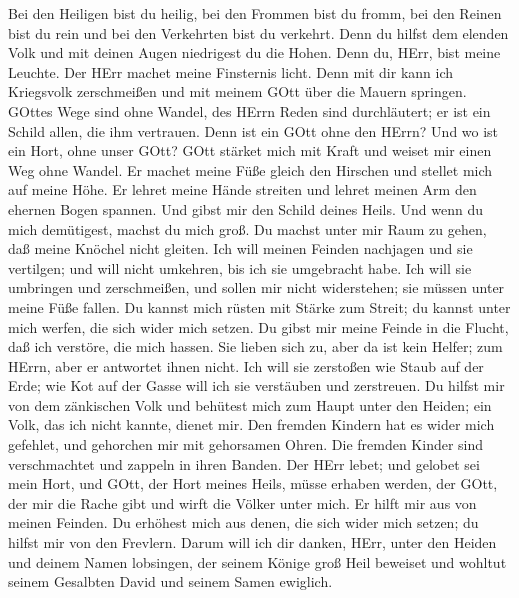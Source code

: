 Bei den Heiligen bist du heilig, bei den Frommen bist du fromm,
 bei den Reinen bist du rein und bei den Verkehrten bist du
verkehrt.  Denn du hilfst dem elenden Volk und mit deinen
Augen niedrigest du die Hohen.  Denn du, HErr, bist meine
Leuchte. Der HErr machet meine Finsternis licht.  Denn mit
dir kann ich Kriegsvolk zerschmeißen und mit meinem GOtt über die Mauern
springen.  GOttes Wege sind ohne Wandel, des HErrn Reden
sind durchläutert; er ist ein Schild allen, die ihm vertrauen.
 Denn ist ein GOtt ohne den HErrn? Und wo ist ein Hort,
ohne unser GOtt?  GOtt stärket mich mit Kraft und weiset
mir einen Weg ohne Wandel.  Er machet meine Füße gleich den
Hirschen und stellet mich auf meine Höhe.  Er lehret meine
Hände streiten und lehret meinen Arm den ehernen Bogen spannen.
 Und gibst mir den Schild deines Heils. Und wenn du mich
demütigest, machst du mich groß.  Du machst unter mir Raum
zu gehen, daß meine Knöchel nicht gleiten.  Ich will meinen
Feinden nachjagen und sie vertilgen; und will nicht umkehren, bis ich
sie umgebracht habe.  Ich will sie umbringen und
zerschmeißen, und sollen mir nicht widerstehen; sie müssen unter meine
Füße fallen.  Du kannst mich rüsten mit Stärke zum Streit;
du kannst unter mich werfen, die sich wider mich setzen. 
Du gibst mir meine Feinde in die Flucht, daß ich verstöre, die mich
hassen.  Sie lieben sich zu, aber da ist kein Helfer; zum
HErrn, aber er antwortet ihnen nicht.  Ich will sie
zerstoßen wie Staub auf der Erde; wie Kot auf der Gasse will ich sie
verstäuben und zerstreuen.  Du hilfst mir von dem
zänkischen Volk und behütest mich zum Haupt unter den Heiden; ein Volk,
das ich nicht kannte, dienet mir.  Den fremden Kindern hat
es wider mich gefehlet, und gehorchen mir mit gehorsamen Ohren.
 Die fremden Kinder sind verschmachtet und zappeln in ihren
Banden.  Der HErr lebet; und gelobet sei mein Hort, und
GOtt, der Hort meines Heils, müsse erhaben werden,  der
GOtt, der mir die Rache gibt und wirft die Völker unter mich.
 Er hilft mir aus von meinen Feinden. Du erhöhest mich aus
denen, die sich wider mich setzen; du hilfst mir von den Frevlern.
 Darum will ich dir danken, HErr, unter den Heiden und
deinem Namen lobsingen,  der seinem Könige groß Heil
beweiset und wohltut seinem Gesalbten David und seinem Samen ewiglich.

